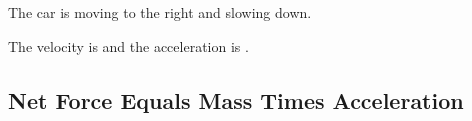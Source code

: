 \documentclass[]{exam}
\begin{document}
\begin{questions}
\question
The car is moving to the right and slowing down. 

\begin{center}
\end{center}

The velocity is \fillin[positive][4cm] and the acceleration is \fillin[negative][4cm].

\end{questions}

\clearpage



\subsection*{Net Force Equals Mass Times Acceleration}
\end{document}
